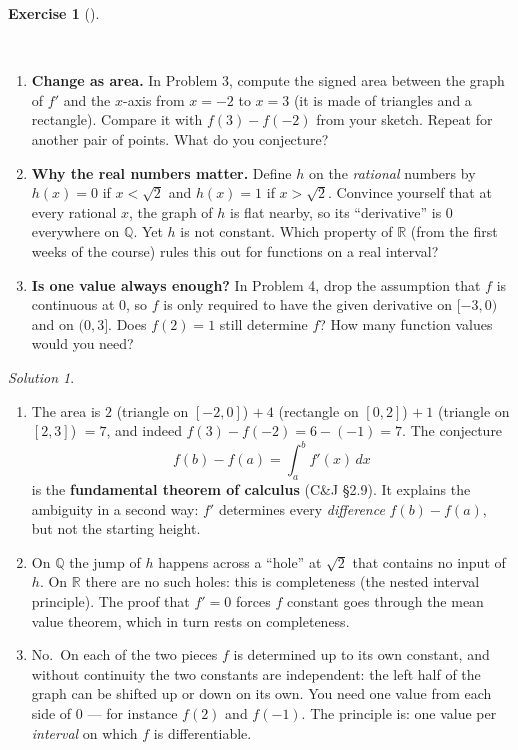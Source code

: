 \documentclass[
  letterpaper,
  DIV=11,
  numbers=noendperiod]{scrreprt}
\providecommand{\tightlist}{%
  \setlength{\itemsep}{0pt}\setlength{\parskip}{0pt}}
\theoremstyle{plain}
\theoremstyle{plain}
\theoremstyle{definition}
\theoremstyle{definition}
\newtheorem{exercise}{Exercise}[chapter]
\theoremstyle{definition}
\theoremstyle{plain}
\theoremstyle{plain}
\theoremstyle{remark}
\newtheorem*{solution}{Solution}
\begin{document}
\begin{exercise}[]\protect\hypertarget{exr-deriv-further}{}\label{exr-deriv-further}

~

\begin{enumerate}
\def\labelenumi{\arabic{enumi}.}
\tightlist
\item
  \textbf{Change as area.} In Problem 3, compute the signed area between
  the graph of \(f'\) and the \(x\)-axis from \(x=-2\) to \(x=3\) (it is
  made of triangles and a rectangle). Compare it with \(f(3) - f(-2)\)
  from your sketch. Repeat for another pair of points. What do you
  conjecture?
\item
  \textbf{Why the real numbers matter.} Define \(h\) on the
  \emph{rational} numbers by \(h(x) = 0\) if \(x < \sqrt2\) and
  \(h(x) = 1\) if \(x > \sqrt2\). Convince yourself that at every
  rational \(x\), the graph of \(h\) is flat nearby, so its
  ``derivative'' is \(0\) everywhere on \(\mathbb{Q}\). Yet \(h\) is not
  constant. Which property of \(\mathbb{R}\) (from the first weeks of
  the course) rules this out for functions on a real interval?
\item
  \textbf{Is one value always enough?} In Problem 4, drop the assumption
  that \(f\) is continuous at \(0\), so \(f\) is only required to have
  the given derivative on \([-3,0)\) and on \((0,3]\). Does \(f(2) = 1\)
  still determine \(f\)? How many function values would you need?
\end{enumerate}

\end{exercise}

\begin{solution}
\leavevmode

\begin{enumerate}
\def\labelenumi{\arabic{enumi}.}
\tightlist
\item
  The area is \(2\) (triangle on \([-2,0]\)) \(+\ 4\) (rectangle on
  \([0,2]\)) \(+\ 1\) (triangle on \([2,3]\)) \(= 7\), and indeed
  \(f(3) - f(-2) = 6 - (-1) = 7\). The conjecture \[
  f(b) - f(a) = \int_a^b f'(x)\,dx
  \] is the \textbf{fundamental theorem of calculus} (C\&J §2.9). It
  explains the ambiguity in a second way: \(f'\) determines every
  \emph{difference} \(f(b)-f(a)\), but not the starting height.
\item
  On \(\mathbb{Q}\) the jump of \(h\) happens across a ``hole'' at
  \(\sqrt2\) that contains no input of \(h\). On \(\mathbb{R}\) there
  are no such holes: this is completeness (the nested interval
  principle). The proof that \(f'=0\) forces \(f\) constant goes through
  the mean value theorem, which in turn rests on completeness.
\item
  No.~On each of the two pieces \(f\) is determined up to its own
  constant, and without continuity the two constants are independent:
  the left half of the graph can be shifted up or down on its own. You
  need one value from each side of \(0\) --- for instance \(f(2)\) and
  \(f(-1)\). The principle is: one value per \emph{interval} on which
  \(f\) is differentiable.
\end{enumerate}

\end{solution}
\end{document}
